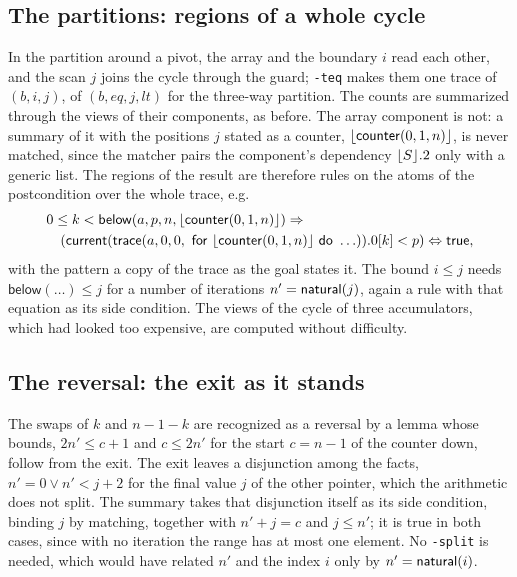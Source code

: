 \subsection{The partitions: regions of a whole cycle}\label{sec:open:partition}
In the partition around a pivot, the array and the boundary $i$ read each other, and the scan $j$ joins the cycle
through the guard; \texttt{-teq} makes them one trace of $(b, i, j)$, of $(b, eq, j, lt)$ for the three-way
partition. The counts are summarized through the views of their components, as before. The array component is not:
a summary of it with the positions $j$ stated as a counter, $\lfloor \mathsf{counter}(0, 1, n)\rfloor$, is never matched, since the matcher
pairs the component's dependency $\lfloor S\rfloor.2$ only with a generic list. The regions of the result are therefore rules
on the atoms of the postcondition over the whole trace, e.g.
\begin{align*}
  &0 \le k < \mathsf{below}(a, p, n, \lfloor \mathsf{counter}(0, 1, n)\rfloor) \Rightarrow\\
  &\quad (\mathsf{current}(\mathsf{trace}(a, 0, 0,\ \mathsf{for}\ \lfloor \mathsf{counter}(0, 1, n)\rfloor\ \mathsf{do}\ \ldots)).0[k] < p) \Leftrightarrow \mathsf{true},
\end{align*}
with the pattern a copy of the trace as the goal states it. The bound $i \le j$ needs $\mathsf{below}(\ldots) \le j$
for a number of iterations $n' = \mathsf{natural}(j)$, again a rule with that equation as its side condition. The views of the cycle of three
accumulators, which had looked too expensive, are computed without difficulty.

\subsection{The reversal: the exit as it stands}\label{sec:open:reverse}
The swaps of $k$ and $n - 1 - k$ are recognized as a reversal by a lemma whose bounds, $2n' \le c + 1$ and $c \le 2n'$
for the start $c = n - 1$ of the counter down, follow from the exit. The exit leaves a disjunction among the facts,
$n' = 0 \vee n' < j + 2$ for the final value $j$ of the other pointer, which the arithmetic does not split. The
summary takes that disjunction itself as its side condition, binding $j$ by matching, together with $n' + j = c$
and $j \le n'$; it is true in both cases, since with no iteration the range has at most one element. No
\texttt{-split} is needed, which would have related $n'$ and the index $i$ only by $n' = \mathsf{natural}(i)$.

